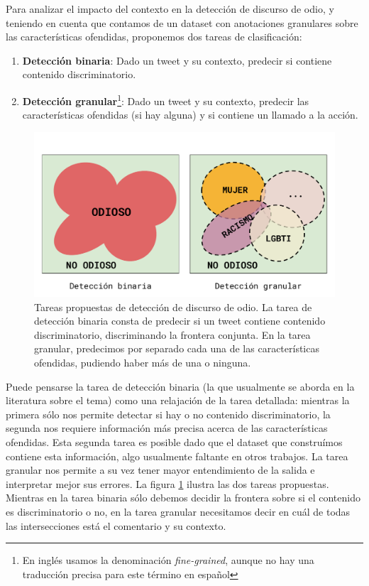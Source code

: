 Para analizar el impacto del contexto en la detección de discurso de odio, y teniendo en cuenta que contamos de un dataset con anotaciones granulares sobre las características ofendidas, proponemos dos tareas de clasificación:

\begin{enumerate}
    \item \textbf{Detección binaria}: Dado un tweet y su contexto, predecir si contiene contenido discriminatorio.
    \item \textbf{Detección granular}\footnote{En inglés usamos la denominación \emph{fine-grained}, aunque no hay una traducción precisa para este término en español}: Dado un tweet y su contexto, predecir las características ofendidas (si hay alguna) y si contiene un llamado a la acción.
\end{enumerate}

\begin{figure}[t]
    \centering
    \includegraphics[width=\textwidth]{img/06/hate_detection_tasks.pdf}
    \caption{Tareas propuestas de detección de discurso de odio. La tarea de detección binaria consta de predecir si un tweet contiene contenido discriminatorio, discriminando la frontera conjunta. En la tarea granular, predecimos por separado cada una de las características ofendidas, pudiendo haber más de una o ninguna.}
    \label{fig:hate_detection_tasks}
\end{figure}



Puede pensarse la tarea de detección binaria (la que usualmente se aborda en la literatura sobre el tema) como una relajación de la tarea detallada: mientras la primera sólo nos permite detectar si hay o no contenido discriminatorio, la segunda nos requiere información más precisa acerca de las características ofendidas. Esta segunda tarea es posible dado que el dataset que construímos contiene esta información, algo usualmente faltante en otros trabajos. La tarea granular nos permite a su vez tener mayor entendimiento de la salida e interpretar mejor sus errores. La figura \ref{fig:hate_detection_tasks} ilustra las dos tareas propuestas. Mientras en la tarea binaria sólo debemos decidir la frontera sobre si el contenido es discriminatorio o no, en la tarea granular necesitamos decir en cuál de todas las intersecciones está el comentario y su contexto.


